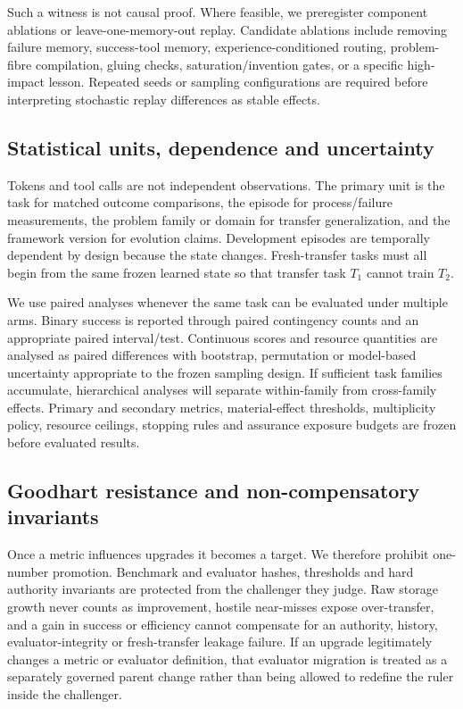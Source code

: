 Such a witness is not causal proof. Where feasible, we preregister component ablations or leave-one-memory-out replay. Candidate ablations include removing failure memory, success-tool memory, experience-conditioned routing, problem-fibre compilation, gluing checks, saturation/invention gates, or a specific high-impact lesson. Repeated seeds or sampling configurations are required before interpreting stochastic replay differences as stable effects.

\subsection{Statistical units, dependence and uncertainty}

Tokens and tool calls are not independent observations. The primary unit is the task for matched outcome comparisons, the episode for process/failure measurements, the problem family or domain for transfer generalization, and the framework version for evolution claims. Development episodes are temporally dependent by design because the state changes. Fresh-transfer tasks must all begin from the same frozen learned state so that transfer task $T_1$ cannot train $T_2$.

We use paired analyses whenever the same task can be evaluated under multiple arms. Binary success is reported through paired contingency counts and an appropriate paired interval/test. Continuous scores and resource quantities are analysed as paired differences with bootstrap, permutation or model-based uncertainty appropriate to the frozen sampling design. If sufficient task families accumulate, hierarchical analyses will separate within-family from cross-family effects. Primary and secondary metrics, material-effect thresholds, multiplicity policy, resource ceilings, stopping rules and assurance exposure budgets are frozen before evaluated results.

\subsection{Goodhart resistance and non-compensatory invariants}

Once a metric influences upgrades it becomes a target. We therefore prohibit one-number promotion. Benchmark and evaluator hashes, thresholds and hard authority invariants are protected from the challenger they judge. Raw storage growth never counts as improvement, hostile near-misses expose over-transfer, and a gain in success or efficiency cannot compensate for an authority, history, evaluator-integrity or fresh-transfer leakage failure. If an upgrade legitimately changes a metric or evaluator definition, that evaluator migration is treated as a separately governed parent change rather than being allowed to redefine the ruler inside the challenger.


